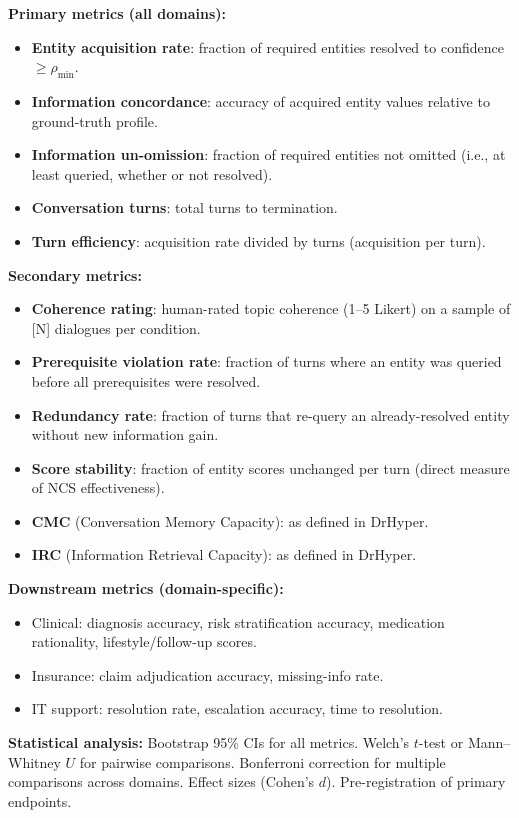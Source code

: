 \documentclass[11pt,a4paper]{article}
\newcommand{\placeholder}[1]{%
  \begin{tcolorbox}[colback=yellow!10,colframe=orange!60!black,
    fonttitle=\bfseries,title=Placeholder]
    #1
  \end{tcolorbox}%
}
\begin{document}
\placeholder{%
  \textbf{Primary metrics (all domains):}
  \begin{itemize}[noitemsep]
    \item \textbf{Entity acquisition rate}: fraction of required entities
          resolved to confidence $\geq \rho_{\min}$.
    \item \textbf{Information concordance}: accuracy of acquired entity
          values relative to ground-truth profile.
    \item \textbf{Information un-omission}: fraction of required entities
          not omitted (i.e., at least queried, whether or not resolved).
    \item \textbf{Conversation turns}: total turns to termination.
    \item \textbf{Turn efficiency}: acquisition rate divided by turns
          (acquisition per turn).
  \end{itemize}

  \textbf{Secondary metrics:}
  \begin{itemize}[noitemsep]
    \item \textbf{Coherence rating}: human-rated topic coherence (1--5
          Likert) on a sample of [N] dialogues per condition.
    \item \textbf{Prerequisite violation rate}: fraction of turns where an
          entity was queried before all prerequisites were resolved.
    \item \textbf{Redundancy rate}: fraction of turns that re-query an
          already-resolved entity without new information gain.
    \item \textbf{Score stability}: fraction of entity scores unchanged per
          turn (direct measure of NCS effectiveness).
    \item \textbf{CMC} (Conversation Memory Capacity): as defined in DrHyper.
    \item \textbf{IRC} (Information Retrieval Capacity): as defined in
          DrHyper.
  \end{itemize}

  \textbf{Downstream metrics (domain-specific):}
  \begin{itemize}[noitemsep]
    \item Clinical: diagnosis accuracy, risk stratification accuracy,
          medication rationality, lifestyle/follow-up scores.
    \item Insurance: claim adjudication accuracy, missing-info rate.
    \item IT support: resolution rate, escalation accuracy, time to
          resolution.
  \end{itemize}

  \textbf{Statistical analysis:}
  Bootstrap 95\% CIs for all metrics. Welch's $t$-test or Mann--Whitney $U$
  for pairwise comparisons. Bonferroni correction for multiple comparisons
  across domains. Effect sizes (Cohen's $d$). Pre-registration of primary
  endpoints.
}
\end{document}
